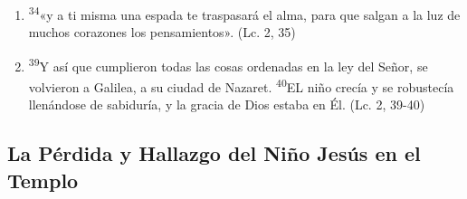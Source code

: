 \documentclass[a4paper,11pt]{article}
\begin{document}
\begin{enumerate}
        \item \textsuperscript{34}«y a ti misma una espada te traspasará el alma, para que salgan a la luz de muchos corazones los pensamientos». (Lc. 2, 35)
        
        \item \textsuperscript{39}Y así que cumplieron todas las cosas ordenadas en la ley del Señor, se volvieron a Galilea, a su ciudad de Nazaret. \textsuperscript{40}EL niño crecía
        y se robustecía llenándose de sabiduría, y la gracia de Dios estaba en Él. (Lc. 2, 39-40)

      \end{enumerate}
            
    \subsection*{\hfil La Pérdida y Hallazgo del Niño Jesús en el Templo \hfil}
      
\end{document}
